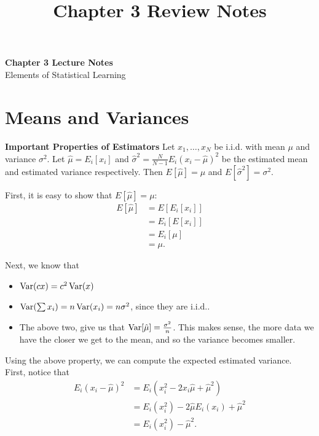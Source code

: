 \documentclass[11pt]{article}
\theoremstyle{definition}
\begin{document}
\title{Chapter 3 Review Notes}

\thispagestyle{empty}

\begin{center}
	{\LARGE \bf Chapter 3 Lecture Notes}\\
	{\large Elements of Statistical Learning}
\end{center}

\section{Means and Variances}

\begin{shaded}
	\textbf{Important Properties of Estimators} \newline
	Let $x_1,\ldots,x_N$ be i.i.d. with mean $\mu$ and variance $\sigma^2$. Let
	$\hat \mu=E_i[x_i]$ and $\hat \sigma^2 = \frac{N}{N-1}E_i(x_i-\hat \mu)^2$ be
	the estimated mean and estimated variance respectively. Then $E[\hat\mu]=\mu$
	and $E[\hat\sigma^2]=\sigma^2$.
\end{shaded}

First, it is easy to show that $E[\hat \mu]=\mu$:
\begin{equation}
	\begin{split}
		E[\hat\mu] &= E[E_i[x_i]] \\
		&= E_i[E[x_i]] \\
		&= E_i[\mu] \\
		&= \mu.
	\end{split}
\end{equation}

Next, we know that
\begin{itemize}
	\item $\operatorname*{Var}(c x)=c^2\operatorname*{Var}(x)$
	\item $\operatorname*{Var}(\sum x_i)=n\operatorname*{Var}(x_i)=n\sigma^2$, since they are i.i.d..
	\item The above two, give us that $\operatorname*{Var}[\hat\mu]=\frac{\sigma^2}{n}$. This
	      makes sense, the more data we have the closer we get to the mean, and so the
	      variance becomes smaller.
\end{itemize}

Using the above property, we can compute the expected estimated variance. First,
notice that
\begin{equation}
	\begin{split}
		E_i(x_i-\hat\mu)^2 &= E_i(x_i^2-2x_i\hat\mu+\hat\mu^2) \\
		&= E_i(x_i^2) - 2\hat\mu E_i(x_i) + \hat\mu^2 \\
		&= E_i(x_i^2) - \hat\mu^2.
	\end{split}
\end{equation}
\end{document}
